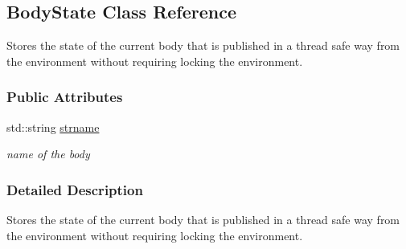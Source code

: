 \hypertarget{classOpenRAVE_1_1KinBody_1_1BodyState}{
\subsection{BodyState Class Reference}
\label{classOpenRAVE_1_1KinBody_1_1BodyState}
}


Stores the state of the current body that is published in a thread safe way from the environment without requiring locking the environment.  


\subsubsection*{Public Attributes}
\begin{DoxyCompactItemize}
\item 
\hypertarget{classOpenRAVE_1_1KinBody_1_1BodyState_a6fffaab81a83fa45de50727fce7e05ca}{
std::string \hyperlink{classOpenRAVE_1_1KinBody_1_1BodyState_a6fffaab81a83fa45de50727fce7e05ca}{strname}}
\label{classOpenRAVE_1_1KinBody_1_1BodyState_a6fffaab81a83fa45de50727fce7e05ca}

\begin{DoxyCompactList}\small\item\em name of the body \item\end{DoxyCompactList}\end{DoxyCompactItemize}


\subsubsection{Detailed Description}
Stores the state of the current body that is published in a thread safe way from the environment without requiring locking the environment. 